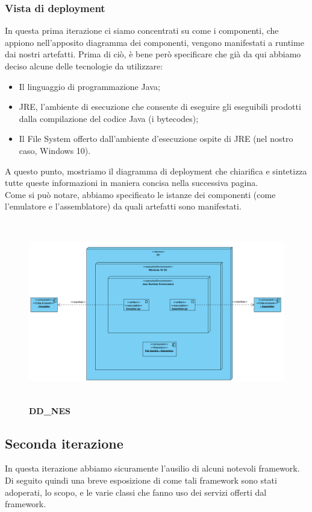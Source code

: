 \documentclass[11pt]{article}
\begin{document}
\subsubsection{Vista di deployment}
In questa prima iterazione ci siamo concentrati su come i componenti, che appiono nell'apposito diagramma dei componenti, vengono manifestati a runtime dai nostri artefatti. Prima di ciò, è bene però specificare che già da qui abbiamo deciso alcune delle tecnologie da utilizzare:
\begin{itemize}
	\item{
		Il linguaggio di programmazione Java;
	}
	\item{
		JRE, l'ambiente di esecuzione che consente di eseguire gli eseguibili prodotti dalla compilazione del codice Java (i bytecodes);
	}
	\item{
		Il File System offerto dall'ambiente d'esecuzione ospite di JRE (nel nostro caso, Windows 10).
	}
\end{itemize}
A questo punto, mostriamo il diagramma di deployment che chiarifica e sintetizza tutte queste informazioni in maniera concisa nella successiva pagina.\\
Come si può notare, abbiamo specificato le istanze dei componenti (come l'emulatore e l'assemblatore) da quali artefatti sono manifestati.
\begin{figure}[t]
\hspace*{-3cm}
\centering
\includegraphics[width=550px, height=300px]{DD_NES.png}\\
\small\textbf{DD\_NES}
\end{figure}

\clearpage
\subsection{Seconda iterazione}
In questa iterazione abbiamo sicuramente l'ausilio di alcuni notevoli framework. Di seguito quindi una breve esposizione di come tali framework sono stati adoperati, lo scopo, e le varie classi che fanno uso dei servizi offerti dal framework.
\end{document}
